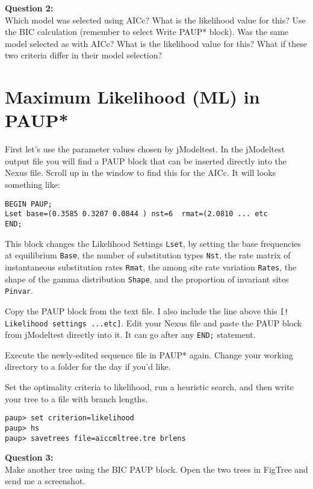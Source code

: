 \documentclass[11pt]{article}
\begin{document}
\begin{framed}
\noindent
\textbf{Question 2:} \\
Which model was selected using AICc?  What is the likelihood value for this?  Use the BIC calculation (remember to select Write PAUP* block).  Was the same model selected as with AICc?  What is the likelihood value for this? What if these two criteria differ in their model selection?  
\end{framed}

\section{Maximum Likelihood (ML) in PAUP*}

First let's use the parameter values chosen by jModeltest.
In the jModeltest output file you will find a PAUP block that can be inserted directly into the Nexus file.  
Scroll up in the window to find this for the AICc.  
It will looks something like:

\begin{verbatim}
BEGIN PAUP;
Lset base=(0.3585 0.3207 0.0844 ) nst=6  rmat=(2.0810 ... etc
END;
\end{verbatim}

This block changes the Likelihood Settings \texttt{Lset}, 
by setting the base frequencies at equilibrium \texttt{Base}, 
the number of substitution types \texttt{Nst}, 
the rate matrix of instantaneous substitution rates \texttt{Rmat}, 
the among site rate variation \texttt{Rates}, 
the shape of the gamma distribution \texttt{Shape}, 
and the proportion of invariant sites \texttt{Pinvar}.


Copy the PAUP block from the text file.  I also include the line above this \texttt{[! Likelihood settings ...etc]}. 
Edit your Nexus file and paste the PAUP block from jModeltest directly into it. 
It can go after any \texttt{END;} statement.  

Execute the newly-edited sequence file in PAUP* again.  Change your working directory to a folder for the day if you'd like.

Set the optimality criteria to likelihood, run a heuristic search, and then write your tree to a file with branch lengths.

\begin{verbatim}
paup> set criterion=likelihood
paup> hs
paup> savetrees file=aiccmltree.tre brlens
\end{verbatim}

\begin{framed}
\noindent
\textbf{Question 3:} \\
Make another tree using the BIC PAUP block. Open the two trees in FigTree and send me a screenshot. 
\end{framed}
\end{document}
